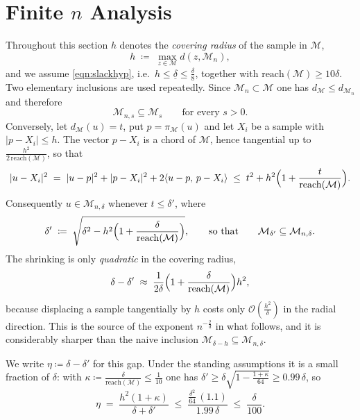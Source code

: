 \documentclass[11pt]{amsart}%
\theoremstyle{plain}
\newcommand{\1}{\mathbf{1}}
\newcommand{\M}{\mathcal{M}}
\begin{document}
\section{Finite \texorpdfstring{$n$}{n} Analysis} \label{sec:finite_n}
\label{Sec:FiniteNAnalysis}

\medskip
\noindent Throughout this section $h$ denotes the \emph{covering radius} of the sample in $\M$,
\[
    h \;\coloneqq\; \max_{z\in \M} d(z, \M_n),
\]
and we assume \eqref{eqn:slackhyp}, i.e.\ $h\le\underline\delta\le\frac{\delta}{8}$, together with
$\mathrm{reach}(\M)\ge 10\delta$. Two elementary inclusions are used
repeatedly. Since $\M_n\subset \M$ one has $d_\M\le d_{\M_n}$ and therefore
\begin{equation}\label{eqn:tubeincl1}
    \M_{n,s}\subseteq \M_s \qquad\text{for every } s>0 .
\end{equation}
Conversely, let $d_\M(u)=t$, put $p=\pi_\M(u)$ and let $X_i$ be a sample with $|p-X_i|\le h$. The
vector $p-X_i$ is a chord of $\M$, hence tangential up to $\frac{h^2}{2\,\mathrm{reach}(\M)}$, so that
\[
    |u-X_i|^2\;=\;|u-p|^2+|p-X_i|^2+2\langle u-p,\,p-X_i\rangle
    \;\le\; t^2+h^2\Bigl(1+\frac{t}{\mathrm{reach}(\M)}\Bigr).
\]
Consequently $u\in \M_{n,\delta}$ whenever $t\le\delta'$, where
\begin{equation}\label{eqn:tubeincl2}
    \delta'\;\coloneqq\;\sqrt{\delta^2-h^2\Bigl(1+\frac{\delta}{\mathrm{reach}(\M)}\Bigr)} ,
    \qquad\text{so that}\qquad \M_{\delta'}\subseteq \M_{n,\delta} .
\end{equation}
The shrinking is only \emph{quadratic} in the covering radius,
\begin{equation}\label{eqn:tubegap}
    \delta-\delta'\;\approx\;\frac{1}{2\delta}\Bigl(1+\frac{\delta}{\mathrm{reach}(\M)}\Bigr)h^2 ,
\end{equation}
because displacing a sample tangentially by $h$ costs only $\mathcal{O}(\frac{h^2}{\delta})$ in the radial direction.
This is the source of the exponent $n^{-\frac{2}{d}}$ in what follows, and it is considerably sharper than
the naive inclusion $\M_{\delta-h}\subseteq \M_{n,\delta}$.

\medskip
\noindent We write $\eta\coloneqq\delta-\delta'$ for this gap. Under the standing assumptions it is
a small fraction of $\delta$: with $\kappa\coloneqq\frac{\delta}{\mathrm{reach}(\M)}\le\frac{1}{10}$ one has
$\delta'\ge\delta\sqrt{1-\frac{1+\kappa}{64}}\ge0.99\,\delta$, so
\begin{equation}\label{eqn:etasmall}
    \eta\;=\;\frac{h^2(1+\kappa)}{\delta+\delta'}
    \;\le\;\frac{\frac{\delta^2}{64}\,(1.1)}{1.99\,\delta}\;\le\;\frac{\delta}{100} .
\end{equation}
\end{document}

